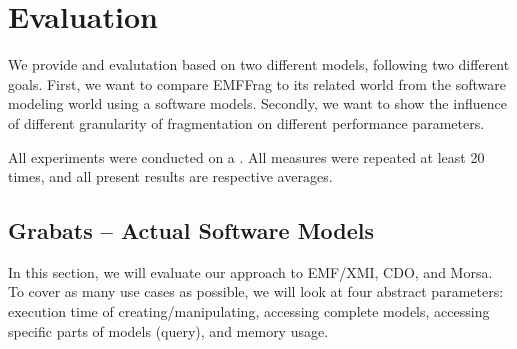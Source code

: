 \section{Evaluation}
\label{sec:evaluation}

We provide and evalutation based on two different models, following two different goals. First, we want to compare EMFFrag to its related world from the software modeling world using a software models. Secondly, we want to show the influence of different granularity of fragmentation on different performance parameters.

All experiments were conducted on a . All measures were repeated at least 20 times, and all present results are respective averages.

\subsection{Grabats -- Actual Software Models}

In this section, we will evaluate our approach to EMF/XMI, CDO, and Morsa. To cover as many use cases as possible, we will look at four abstract parameters: execution time of creating/manipulating, accessing complete models, accessing specific parts of models (query), and memory usage.

